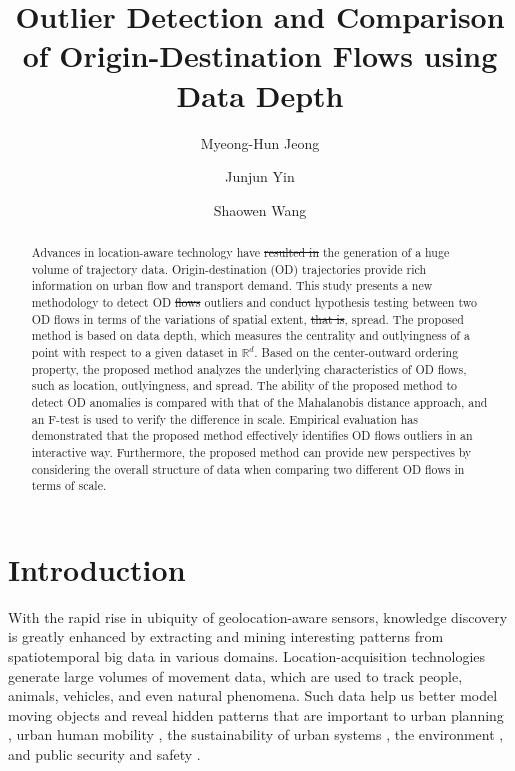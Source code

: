 \documentclass[a4paper,UKenglish]{lipics-v2018}
\title{Outlier Detection and Comparison of Origin-Destination Flows using Data Depth}
\author{Myeong-Hun Jeong}{Department of Civil Engineering, Chosun University, Gwangju, Republic of Korea}{mhjeong@chosun.ac.kr}{[orcid]}{[funding]}
\author{Junjun Yin}{Social Science Research Institute; Institute for CyberScience, Penn State University, PA, USA}{jyin@psu.edu}{[0000-0002-4196-2439]}{[This work used the Extreme Science and Engineering Discovery Environment (XSEDE), which is supported by National Science Foundation grant number ACI-1548562]} %
\author{Shaowen Wang}{Department of Geography and Geographic Information Science, University of Illinois at Urbana-Champaign, IL, USA}{shaowen@illinois.edu}{[orcid]}{[funding]}
\providecommand{\DIFadd}[1]{{\protect\color{blue}\uwave{#1}}} %
\providecommand{\DIFdel}[1]{{\protect\color{red}\sout{#1}}}                      %
\providecommand{\DIFaddbegin}{} %
\providecommand{\DIFaddend}{} %
\providecommand{\DIFdelbegin}{} %
\providecommand{\DIFdelend}{} %
\begin{document}
\maketitle

\begin{abstract}
Advances in location-aware technology have \DIFdelbegin \DIFdel{resulted in }\DIFdelend \DIFaddbegin \DIFadd{led to }\DIFaddend the generation of a huge volume of trajectory data.
Origin-destination (OD) trajectories provide rich information on urban flow and transport demand.
This study presents a new methodology to detect OD \DIFdelbegin \DIFdel{flows }\DIFdelend \DIFaddbegin \DIFadd{flow }\DIFaddend outliers and conduct hypothesis testing between two OD flows in terms of the variations of spatial extent, \DIFdelbegin \DIFdel{that is}\DIFdelend \DIFaddbegin \DIFadd{namely}\DIFaddend , spread.
The proposed method is based on data depth, which measures the centrality and outlyingness of a point with respect to a given dataset in $\mathbb{R}^d$.
Based on the center-outward ordering property, the proposed method analyzes the underlying characteristics of OD flows, such as location, outlyingness, and spread.
The ability of the proposed method to detect OD anomalies is compared with that of the Mahalanobis distance approach, and an F-test is used to verify the difference in scale. Empirical evaluation has demonstrated that the proposed method effectively identifies OD flows outliers in an interactive way. Furthermore, the proposed method can provide new perspectives by considering the overall structure of data when comparing two different OD flows in terms of scale. 

 \end{abstract}

\section{Introduction}
With the rapid rise in ubiquity of geolocation-aware sensors, knowledge discovery is greatly enhanced by extracting and mining interesting patterns from spatiotemporal big data in various domains.
Location-acquisition technologies generate large volumes of movement data, which are used to track people, animals, vehicles, and even natural phenomena.
Such data help us better model moving objects and reveal hidden patterns that are important to urban planning \cite{mazimpaka15AGILE}, urban human mobility \cite{yin2017depicting,kwan1998space}, the sustainability of urban systems \cite{alberti2003integrating,chen13Percom}, the environment \cite{devarakonda13SIGKDD}, and public security and safety \cite{buchin14JOSIS}.
\end{document}
